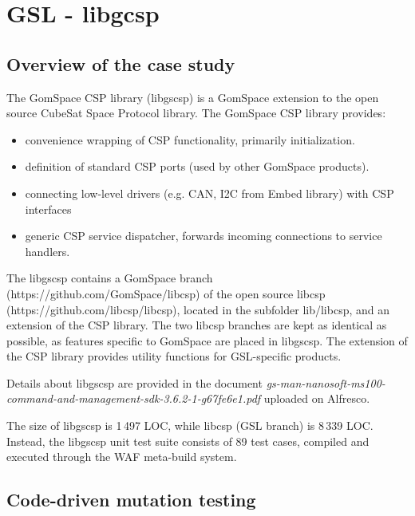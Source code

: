 
\clearpage

\section{GSL - libgcsp}
\label{sec:caseStudies:GSL:libgcsp}

\subsection{Overview of the case study}

The GomSpace CSP library (libgscsp) is a GomSpace extension to the open source CubeSat Space Protocol library.
The GomSpace CSP library provides:
\begin{itemize}
\item convenience wrapping of CSP functionality, primarily initialization.
\item definition of standard CSP ports (used by other GomSpace products).
\item connecting low-level drivers (e.g. CAN, I2C from Embed library) with CSP interfaces 
\item generic CSP service dispatcher, forwards incoming connections to service handlers.
\end{itemize}

The libgscsp contains a GomSpace branch (https://github.com/GomSpace/libcsp) of the open source libcsp (https://github.com/libcsp/libcsp), located in the subfolder lib/libcsp, and an extension of the CSP library. The two libcsp branches are kept as identical as possible, as features specific to GomSpace are placed in libgscsp. The extension of the CSP library provides utility functions for GSL-specific products.

Details about libgscsp are provided in the document \emph{gs-man-nanosoft-ms100-command-and-management-sdk-3.6.2-1-g67fe6e1.pdf} uploaded on Alfresco.


The size of libgscsp is 1\,497 LOC, %
while libcsp (GSL branch) is 8\,339 LOC. %
Instead, the libgscsp unit test suite consists of 89 test cases, compiled and executed through the WAF meta-build system.

\subsection{Code-driven mutation testing}



